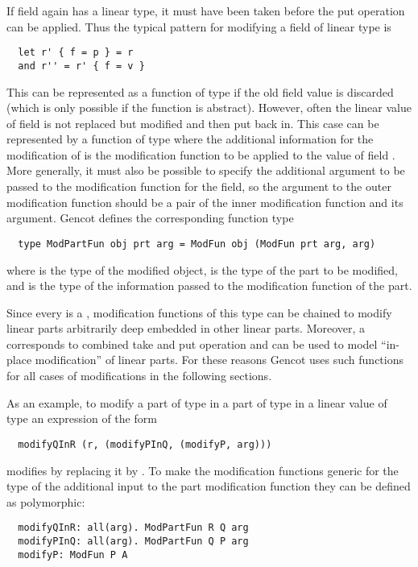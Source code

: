 If field  again has a linear type, it must have been taken before the put operation can be applied. Thus the 
typical pattern for modifying a field of linear type is
\begin{verbatim}
  let r' { f = p } = r 
  and r'' = r' { f = v }
\end{verbatim}
This can be represented as a function of type  if the old field value is discarded (which is only possible
if the function is abstract). However, often the linear value of field  is not replaced but modified and then put back
in. This case can be represented by a function of type  where the additional information for the modification
of  is the modification function to be applied to the value of field . More generally, it must also be possible
to specify the additional argument to be passed to the modification function for the field, so the argument to the outer 
modification function should be a pair of the inner modification function and its argument. Gencot defines the corresponding
function type
\begin{verbatim}
  type ModPartFun obj prt arg = ModFun obj (ModFun prt arg, arg)
\end{verbatim}
where  is the type of the modified object,  is the type of the part to be modified, and  is the type
of the information passed to the modification function of the part.

Since every  is a , modification functions of this type can be chained to modify linear parts arbitrarily 
deep embedded in other linear parts. Moreover, a  corresponds to combined take and put operation and can be used
to model ``in-place modification'' of linear parts. For these reasons Gencot uses such functions for all cases of modifications 
in the following sections.

As an example, to modify a part  of type  in a part  of type  in a linear value  of type 
an expression of the form
\begin{verbatim}
  modifyQInR (r, (modifyPInQ, (modifyP, arg)))
\end{verbatim}
modifies  by replacing it by . To make the modification functions generic for the type of the additional input
to the part modification function they can be defined as polymorphic:
\begin{verbatim}
  modifyQInR: all(arg). ModPartFun R Q arg
  modifyPInQ: all(arg). ModPartFun Q P arg
  modifyP: ModFun P A
\end{verbatim}

